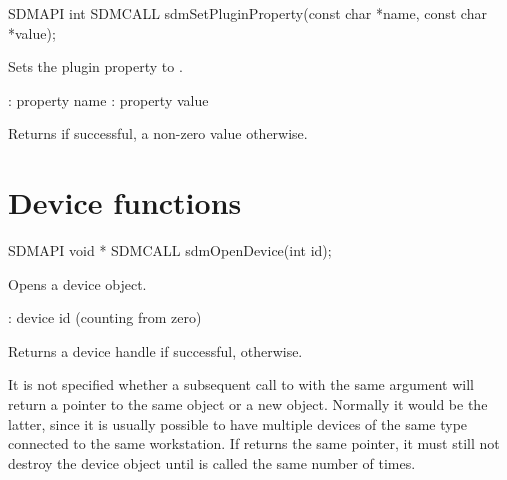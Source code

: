 \documentclass[a4paper,12pt,twoside,extrafontsizes]{memoir}
\begin{document}


\begin{cfuncprototype}
SDMAPI int SDMCALL sdmSetPluginProperty(const char *name, const char *value);
\end{cfuncprototype}

\begin{funcdescr}
	Sets the plugin property  to .
\end{funcdescr}

\begin{funcparams}
	: property name
	: property value
\end{funcparams}

\begin{funcret}
	Returns  if successful, a non-zero value otherwise.
\end{funcret}

\section{Device functions}



\begin{cfuncprototype}
SDMAPI void * SDMCALL sdmOpenDevice(int id);
\end{cfuncprototype}

\begin{funcdescr}
	Opens a device object.
\end{funcdescr}

\begin{funcparams}
	: device id (counting from zero)
\end{funcparams}

\begin{funcret}
	Returns a device handle if successful,  otherwise.
\end{funcret}

\begin{funcremarks}
	It is not specified whether a subsequent call to  with the same  argument will return a pointer to the same object or a new object. Normally it would be the latter, since it is usually possible to have multiple devices of the same type connected to the same workstation. If  returns the same pointer, it must still not destroy the device object until  is called the same number of times.
\end{funcremarks}
\end{document}
